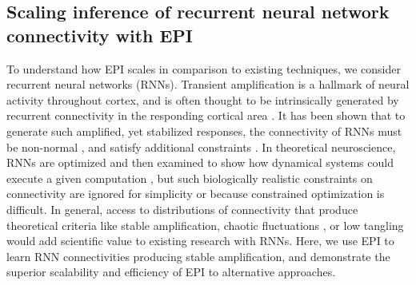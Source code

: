 \documentclass[11pt]{article}
\begin{document}
\subsection{Scaling inference of recurrent neural network connectivity with EPI} \label{results_RNN}
To understand how EPI scales in comparison to existing techniques, we consider recurrent neural networks (RNNs).
Transient amplification is a hallmark of neural activity throughout cortex, and is often thought to be intrinsically generated by recurrent connectivity in the responding cortical area \cite{murphy2009balanced, hennequin2014optimal, bondanelli2019population}.
It has been shown that to generate such amplified, yet stabilized responses, the connectivity of RNNs must be non-normal \cite{goldman2009memory, murphy2009balanced}, and satisfy additional constraints \cite{bondanelli2020coding}.
In theoretical neuroscience, RNNs are optimized and then examined to show how dynamical systems could execute a given computation \cite{sussillo2014neural, barak2017recurrent}, but such biologically realistic constraints on connectivity \cite{goldman2009memory, murphy2009balanced, bondanelli2020coding} are ignored for simplicity or because constrained optimization is difficult.
In general, access to distributions of connectivity that produce theoretical criteria like stable amplification, chaotic fluctuations \cite{sompolinsky1988chaos}, or low tangling \cite{russo2018motor} would add scientific value to existing research with RNNs.
Here, we use EPI to learn RNN connectivities producing stable amplification, and demonstrate the superior scalability and efficiency of EPI to alternative approaches.
\end{document}
